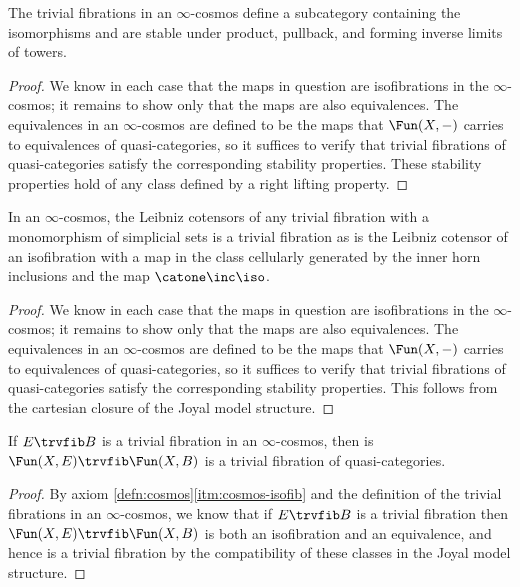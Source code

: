 \begin{lemma}\label{lem:trivial-fib-conical}
  The trivial fibrations in an $\infty$-cosmos define a subcategory containing the isomorphisms and are stable under product, pullback, and forming inverse limits of towers.
\end{lemma}
\begin{proof}
  We know in each case that the maps in question are isofibrations in the $\infty$-cosmos; it remains to show only that the maps are also equivalences. The equivalences in an $\infty$-cosmos are defined to be the maps that $\Fun(X,-)$ carries to equivalences of quasi-categories, so it suffices to verify that trivial fibrations of quasi-categories satisfy the corresponding stability properties. These stability properties hold of any class defined by a right lifting property.
\end{proof}



\begin{lemma}\label{lem:trivial-fib-leibniz}
  In an $\infty$-cosmos, the Leibniz cotensors of any trivial fibration with a monomorphism of simplicial sets is a trivial fibration as is the Leibniz cotensor of an isofibration with a map in the class cellularly generated by the inner horn inclusions and the map $\catone\inc\iso$.
\end{lemma}
\begin{proof}
We know in each case that the maps in question are isofibrations in the $\infty$-cosmos; it remains to show only that the maps are also equivalences. The equivalences in an $\infty$-cosmos are defined to be the maps that $\Fun(X,-)$ carries to equivalences of quasi-categories, so it suffices to verify that trivial fibrations of quasi-categories satisfy the corresponding stability properties. This follows from the cartesian closure of the Joyal model structure.
\end{proof}


\begin{lemma}\label{lem:trivial-fib-representability}
If $E \trvfib B$ is a trivial fibration in an $\infty$-cosmos, then is $\Fun(X,E)\trvfib\Fun(X,B)$ is a trivial fibration of quasi-categories.
\end{lemma}
\begin{proof}
By axiom \ref{defn:cosmos}\ref{itm:cosmos-isofib} and the definition of the trivial fibrations in an $\infty$-cosmos, we know that if $E \trvfib B$ is a trivial fibration then  $\Fun(X,E)\trvfib\Fun(X,B)$ is both an isofibration and an equivalence, and hence is a trivial fibration by the compatibility of these classes in the Joyal model structure.
\end{proof}


